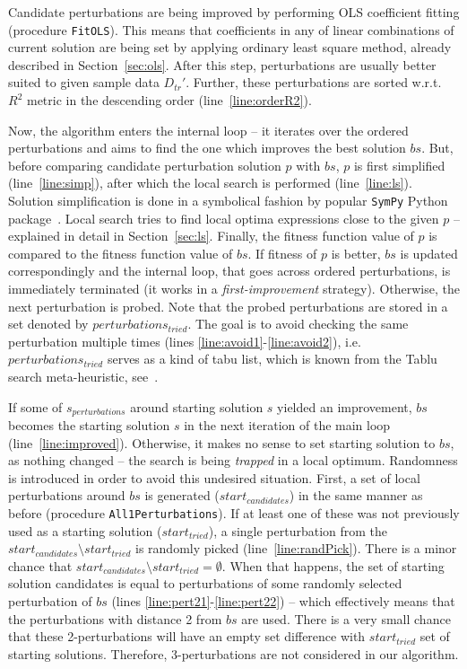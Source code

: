 \documentclass[a4paper,12pt]{elsarticle}
\begin{document}
Candidate perturbations are being improved by performing OLS coefficient fitting (procedure \texttt{FitOLS}). This means that coefficients in any of linear combinations of current solution are being set by applying  ordinary least square method, already described in Section~\ref{sec:ols}. 
After this step, perturbations are usually better suited to given sample data $D_{tr}'$. 
Further, these perturbations are sorted w.r.t. $R^2$ metric in the descending order (line~\ref{line:orderR2}). 

Now, the algorithm enters the internal loop -- it iterates over the ordered perturbations and aims to find the one which improves the best solution $bs$. But, before comparing candidate perturbation solution $p$ with $bs$, $p$ is first simplified (line~\ref{line:simp}), after which the local search is performed (line~\ref{line:ls}).
Solution simplification is done in a symbolical fashion by popular \texttt{SymPy} Python package~\cite{sympy}.
Local search tries to find local optima expressions close to the given $p$ -- explained in detail in Section~\ref{sec:ls}.  
Finally, the fitness function value of $p$ is compared to the fitness function value of $bs$. If fitness of $p$ is better, $bs$ is updated correspondingly and the internal loop, that goes across ordered perturbations, is immediately terminated (it works in a  \emph{first-improvement} strategy). Otherwise, the next perturbation is probed. 
Note that the probed perturbations are stored in a set denoted by $perturbations_{tried}$. The goal is to avoid checking the same perturbation multiple times (lines \ref{line:avoid1}-\ref{line:avoid2}), i.e. $perturbations_{tried}$ serves as a kind of tabu list, which is known from the Tablu search meta-heuristic, see~\cite{glover1998tabu}.    


If some of $s_{perturbations}$ around starting solution $s$ yielded an improvement, $bs$ becomes the starting solution $s$ in the next iteration of the main loop (line~\ref{line:improved}). 
Otherwise, it makes no sense to set starting solution to $bs$, as nothing changed -- the search is being  \emph{trapped} in a local optimum. Randomness is introduced in order to avoid this undesired situation. First, a set of local perturbations around $bs$ is generated ($start_{candidates}$) in the same manner as before (procedure \texttt{All1Perturbations}). If at least one of these was not previously used as a starting solution ($start_{tried}$), a single perturbation from the $start_{candidates} \setminus start_{tried}$ is randomly picked (line~\ref{line:randPick}). There is a minor chance that $start_{candidates} \setminus start_{tried} = \emptyset$. When that happens, the set of starting solution candidates is equal to perturbations of some randomly selected perturbation of $bs$ (lines \ref{line:pert21}-\ref{line:pert22}) -- which effectively means that the perturbations with distance 2 from $bs$ are used. There is a very small chance that these 2-perturbations will have an empty set difference with $start_{tried}$ set of starting solutions. Therefore, 3-perturbations are not considered in our algorithm. 
\end{document}
